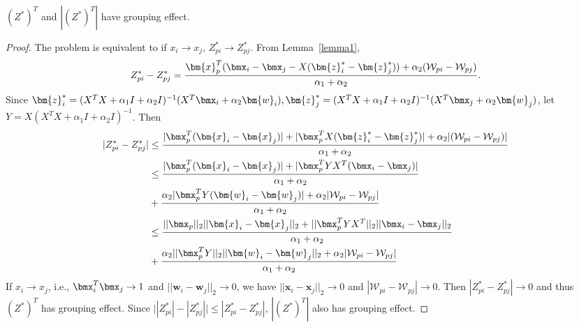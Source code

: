 \begin{lemma}
\label{lemma3}
$(Z^*)^T$ and $|(Z^*)^T|$ have grouping effect. 
\begin{proof}
The problem is equivalent to if $x_i \rightarrow x_j$, $Z^*_{pi} \rightarrow Z^*_{pj}$.
From Lemma~\ref{lemma1},
\begin{equation}
\nonumber
Z_{pi}^*-Z_{pj}^* = \frac{\bm{x}_p^T ( \bmx_i - \bmx_j - X(\bm{z}_i^*-\bm{z}_j^*)) + \alpha_2 (\mathcal{W}_{pi}-\mathcal{W}_{pj})}{\alpha_1+\alpha_2}.
\end{equation}
Since $\bm{z}_i^* = (X^TX + \alpha_1I + \alpha_2I)^{-1}(X^T\bmx_i+\alpha_2\bm{w}_i),\bm{z}_j^* = (X^TX + \alpha_1I + \alpha_2I)^{-1}(X^T\bmx_j+\alpha_2\bm{w}_j)$,
let $Y = X(X^TX + \alpha_1I + \alpha_2I)^{-1}$. Then
\begin{equation}
\begin{split}
|Z_{pi}^*-Z_{pj}^*| & \leq \frac{|\bmx_p^T(\bm{x}_i - \bm{x}_j)| + |\bmx_p^TX(\bm{z}_i^*-\bm{z}_j^*)| + \alpha_2 |(\mathcal{W}_{pi}-\mathcal{W}_{pj})|}{\alpha_1+\alpha_2}\\
& \leq \frac{|\bmx_p^T(\bm{x}_i - \bm{x}_j)| + |\bmx_p^TYX^T(\bmx_i-\bmx_j)|}{\alpha_1+\alpha_2}\\
& + \frac{\alpha_2|\bmx_p^TY(\bm{w}_i - \bm{w}_j)| + \alpha_2 |\mathcal{W}_{pi}-\mathcal{W}_{pj}|}{\alpha_1+\alpha_2}\\
& \leq \frac{||\bmx_p||_2||\bm{x}_i - \bm{x}_j||_2 + ||\bmx_p^TYX^T||_2||\bmx_i-\bmx_j||_2}{\alpha_1+\alpha_2}\\
& + \frac{\alpha_2||\bmx_p^TY||_2||\bm{w}_i - \bm{w}_j||_2 + \alpha_2 |\mathcal{W}_{pi}-\mathcal{W}_{pj}|}{\alpha_1+\alpha_2}\\
\end{split}
\end{equation}
If $x_i \rightarrow x_j$, i.e., $\bmx_i^T\bmx_j \rightarrow 1$ and $||\bm{w}_i - \bm{w}_j||_2 \rightarrow 0$, 
we have
$||\bm{x}_i - \bm{x}_j||_2 \rightarrow 0$ and $|\mathcal{W}_{pi}-\mathcal{W}_{pj}| \rightarrow 0$.
Then $|Z_{pi}^*-Z_{pj}^*| \rightarrow 0$ and
thus $(Z^*)^T$ has grouping effect.
Since $\bigl||Z_{pi}^*|-|Z_{pj}^*|\bigr| \leq |Z_{pi}^*-Z_{pj}^*|$, $|(Z^*)^T|$ also has grouping effect.
\end{proof}
\end{lemma}

